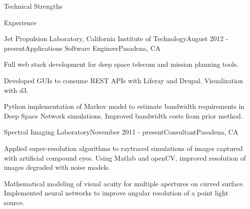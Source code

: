 \documentclass{resume} %
\begin{document}

\begin{rSection}{Technical Strengths}


\end{rSection}


\begin{rSection}{Experience}

\begin{rSubsection}{Jet Propulsion Laboratory, California Institute of Technology}{August 2012 - present}{Applications Software Engineer}{Pasadena, CA}
\item Full web stack development for deep space telecom and mission planning tools. 
\item Developed GUIs to consume REST APIs with Liferay and Drupal. Visualization with d3.
\item Python implementation of Markov model to estimate bandwidth requirements in Deep Space Network simulations. Improved bandwidth costs from prior method.

\end{rSubsection}


\begin{rSubsection}{Spectral Imaging Laboratory}{November 2011 - present}{Consultant}{Pasadena, CA}
\item Applied super-resolution algorithms to raytraced simulations of images captured with artificial compound eyes. Using Matlab and openCV, improved resolution of images degraded with noise models.
\item Mathematical modeling of visual acuity for multiple apertures on curved surface. Implemented neural networks to improve angular resolution of a point light source. 
\end{rSubsection}



\end{rSection}
\end{document}
